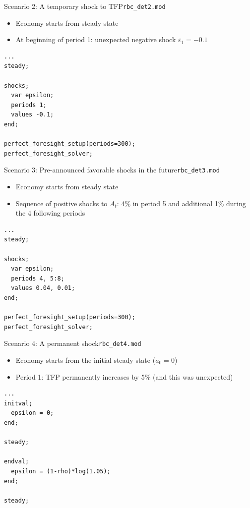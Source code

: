 \documentclass[handout,usepdftitle=false,xcolor=dvipsnames,aspectratio=169]{beamer}
\begin{document}
\begin{frame}[fragile]{Scenario 2: A temporary shock to TFP}{\texttt{rbc\_det2.mod}}
  \begin{itemize}
    \item Economy starts from steady state
    \item At beginning of period 1: unexpected negative shock $\varepsilon_1=-0.1$
  \end{itemize}

  \begin{verbatim}
...
steady;

shocks;
  var epsilon;
  periods 1;
  values -0.1;
end;

perfect_foresight_setup(periods=300);
perfect_foresight_solver;
\end{verbatim}
\end{frame}

\begin{frame}[fragile]{Scenario 3: Pre-announced  favorable shocks in the future}{\texttt{rbc\_det3.mod}}
  \begin{itemize}
    \item Economy starts from steady state
    \item Sequence of positive shocks to $A_t$: 4\% in period 5 and additional 1\% during the 4 following periods
  \end{itemize}

  \begin{verbatim}
...
steady;

shocks;
  var epsilon;
  periods 4, 5:8;
  values 0.04, 0.01;
end;

perfect_foresight_setup(periods=300);
perfect_foresight_solver;
\end{verbatim}
\end{frame}

\begin{frame}[fragile]{Scenario 4: A permanent shock}{\texttt{rbc\_det4.mod}}
  \begin{itemize}
    \item Economy starts from the initial steady state ($a_0=0$)
    \item Period 1: TFP permanently increases by 5\% (and this was unexpected)
  \end{itemize}

  \begin{verbatim}
...
initval;
  epsilon = 0;
end;

steady;

endval;
  epsilon = (1-rho)*log(1.05);
end;

steady;
\end{verbatim}
\end{frame}
\end{document}

